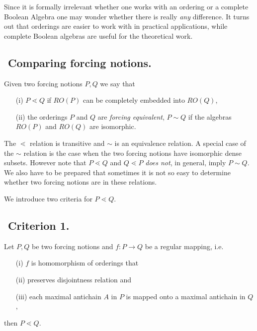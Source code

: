 Since it is formally irrelevant whether one works with an ordering
or a complete Boolean Algebra one may wonder whether there is really \emph{any}
difference. It turns out that orderings are easier to work with in
practical applications, while complete Boolean algebras are useful for
the theoretical work.


\subsection{${}$ \hspace{-1em}Comparing forcing notions.}

\begin{definition}\label{compare} Given two forcing notions $P,Q$ we say that
 \begin{itemize}
  \item[(i)] $P\lessdot Q$ if $RO(P)$ can be completely embedded into $RO(Q)$,
  \item[(ii)] the orderings $P$ and $Q$ are \emph{forcing equivalent},
	$P\sim Q$ if the algebras $RO(P)$ and $RO(Q)$ are isomorphic.
 \end{itemize}
\end{definition}

The $\lessdot$ relation is transitive and $\sim$ is an equivalence relation. A special case of the $\sim$ relation is the case when
the two forcing notions have isomorphic dense subsets. However note that $P\lessdot Q$ and $Q\lessdot P$ \emph{does not},
in general, imply $P\sim Q$. We also have to be prepared that sometimes it is not so easy
to determine whether two forcing notions are in these relations.

\medskip

We introduce two criteria for $P\lessdot Q$.
\subsection{${}$ \hspace{-1em}Criterion 1.}\label{criterium1}
Let $P,Q$ be two forcing notions and $f : P \rightarrow Q$ be a regular mapping, i.e.
\begin{itemize}
 \item[(i)] $f$ is homomorphism of orderings that
 \item[(ii)] preserves disjointness relation and
 \item[(iii)] each maximal antichain $A$ in $P$ is mapped
	onto a maximal antichain in $Q$,
\end{itemize}
then $P\lessdot Q$.

